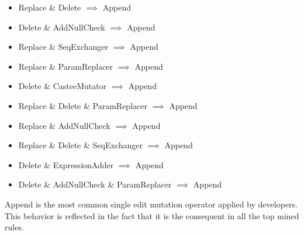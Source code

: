 \documentclass[conference]{IEEEtran}
\begin{document}
\begin{itemize}
 \item Replace \& Delete $\implies$ Append
 \item Delete \& AddNullCheck $\implies$ Append
 \item Replace \& SeqExchanger $\implies$ Append
 \item Replace \& ParamReplacer $\implies$ Append
 \item Delete \& CasteeMutator $\implies$ Append
 \item Replace \& Delete \& ParamReplacer $\implies$ Append
 \item Replace \& AddNullCheck $\implies$ Append
 \item Replace \& Delete \& SeqExchanger $\implies$ Append
 \item Delete \& ExpressionAdder $\implies$ Append
 \item Delete \& AddNullCheck \& ParamReplacer $\implies$ Append
\end{itemize}

Append is the most common single edit mutation operator applied by developers. This behavior is
reflected in the fact that it is the consequent in all the top mined
rules.  
\end{document}
